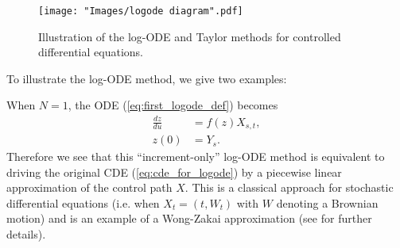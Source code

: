 \begin{figure}\label{diag:logode}
\begin{center}
\texttt{[image: "Images/logode diagram".pdf]}
\caption{Illustration of the log-ODE and Taylor methods for controlled differential equations.}
\end{center}
\end{figure}

To illustrate the log-ODE method, we give two examples:
\begin{example}
When $N = 1$, the ODE (\ref{eq:first_logode_def}) becomes
\begin{align*}
\frac{dz}{du} & = f(z)X_{s,t},\\[3pt]
z(0) & = Y_s.
\end{align*}
Therefore we see that this ``increment-only'' log-ODE method is equivalent to driving the original CDE (\ref{eq:cde_for_logode}) by a piecewise linear approximation of the control path $X$. This is a classical approach
for stochastic differential equations (i.e. when $X_t = (t, W_t)$ with $W$ denoting a Brownian motion) and is an example of a Wong-Zakai approximation (see \cite{wongzakai1965} for further details).
\end{example}


